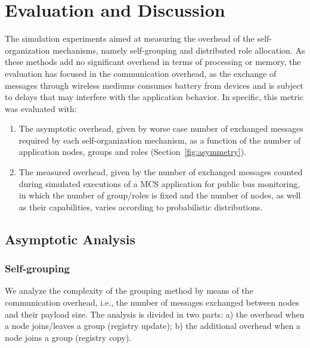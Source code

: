 \section{Evaluation and Discussion}\label{sec:evaluation}



The simulation experiments aimed at measuring the overhead of the self-organization mechanisms, namely self-grouping and distributed role allocation. As these methods add no significant overhead in terms of processing or memory, the evaluation has focused in the communication overhead, as the exchange of messages through wireless mediums consumes battery from devices and is subject to delays that may interfere with the application behavior. In specific, this metric was evaluated with:

\begin{enumerate}[label=\Alph*]
	
	\item The asymptotic overhead, given by worse case number of exchanged messages required by each self-organization mechanism, as a function of the number of application nodes, groups and roles (Section~\ref{fig:asymmetry}). 
	
	\item The measured overhead, given by the number of exchanged messages counted during simulated executions of a MCS application for public bus monitoring, in which the number of group/roles is fixed and the number of nodes, as well as their capabilities, varies according to probabilistic distributions.
	
\end{enumerate}


\subsection{Asymptotic Analysis} 

\subsubsection{\textbf{Self-grouping}} We analyze the complexity of the grouping method by means of the communication overhead, i.e., the number of messages exchanged between nodes and their payload size. The analysis is divided in two parts: a) the overhead when a node joins/leaves a group (registry update); b) the additional overhead when a node joins a group (registry copy).

